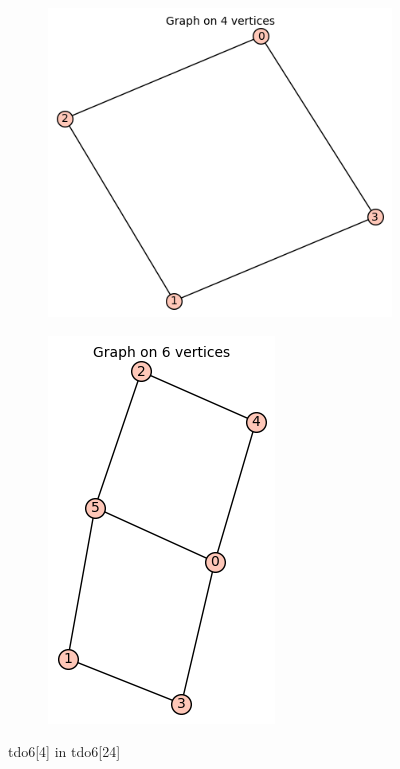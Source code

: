 \documentclass[12pt, a4paper]{article}
\begin{document}
\begin{center}
\begin{figure}[!htb]
\centering
\begin{subfigure}{0.5\textwidth}
  \centering
  \includegraphics[width=0.5\linewidth]{tdo6[4]}
\end{subfigure}%
\begin{subfigure}{0.5\textwidth}
  \centering
  \includegraphics[width=0.35\linewidth]{tdo6[24]}
\end{subfigure}
\caption{tdo6[4] in tdo6[24]}
\label{fig:test}
\end{figure}


\end{center}
\end{document}
